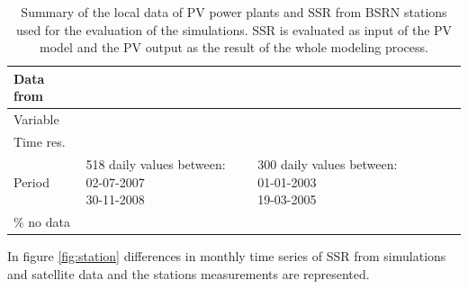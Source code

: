\begin{table}[h!]
  \begin{tabular}{>{\raggedright}m{2cm}>{\raggedright}m{2cm}>{\raggedright}m{2cm}>{\raggedright}m{2cm}>{\raggedright}m{2cm}>{\raggedright}m{2cm}}
    \toprule 
    Data from & \centering{Seville} & \centering{Tarragona} & \centering{Payerne} &\centering{Sede Boker} &\centering{Carpentras}\tabularnewline
    \midrule
    Variable & \centering{PV productivity} & \centering{PV productivity} & \centering{SSR} & \centering{SSR} & \centering{SSR} 
\tabularnewline
    \midrule
    Time res. & \centering{day} & \centering{day} & \centering{month} & \centering{month} & \centering{month}
                    \tabularnewline
   \midrule
                                                                                            Period & \centering{518 {\small{daily values between:}} 02-07-2007\\30-11-2008} & \centering{300 {\small{daily values between:}} 01-01-2003\\19-03-2005} & \centering{2003-2009} & \centering{2003-2009} & \centering{2003-2009}
                  \tabularnewline    
 \midrule
    $\%$ no data & \centering{0} & \centering{8 $\%$} & \centering{0} & \centering{10.71 $\%$} & \centering{0}
                    \tabularnewline

 \bottomrule
  \end{tabular}
  \caption{Summary of the local data of PV power plants and SSR from BSRN stations used for the evaluation of the simulations. SSR is evaluated as input of the PV model and the PV output as the result of the whole modeling process.}
  \label{localData}
\end{table}

In figure \ref{fig:station} differences in monthly time series of SSR from simulations and satellite data and the stations measurements are represented.

